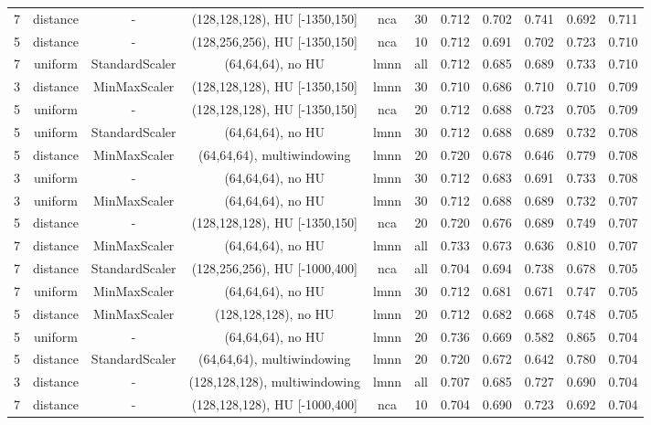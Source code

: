 \begin{sidewaystable}[!htbp]
{\begin{tabular}{ccccccccccc}
7 & distance & - & (128,128,128), HU [-1350,150] & nca & 30 & 0.712 & 0.702 & 0.741 & 0.692 & 0.711 \\
5 & distance & - & (128,256,256), HU [-1350,150] & nca & 10 & 0.712 & 0.691 & 0.702 & 0.723 & 0.710 \\
7 & uniform & StandardScaler & (64,64,64), no HU & lmnn & all & 0.712 & 0.685 & 0.689 & 0.733 & 0.710 \\
3 & distance & MinMaxScaler & (128,128,128), HU [-1350,150] & lmnn & 30 & 0.710 & 0.686 & 0.710 & 0.710 & 0.709 \\
5 & uniform & - & (128,128,128), HU [-1350,150] & nca & 20 & 0.712 & 0.688 & 0.723 & 0.705 & 0.709 \\
5 & uniform & StandardScaler & (64,64,64), no HU & lmnn & 30 & 0.712 & 0.688 & 0.689 & 0.732 & 0.708 \\
5 & distance & MinMaxScaler & (64,64,64), multiwindowing & lmnn & 20 & 0.720 & 0.678 & 0.646 & 0.779 & 0.708 \\
3 & uniform & - & (64,64,64), no HU & lmnn & 30 & 0.712 & 0.683 & 0.691 & 0.733 & 0.708 \\
3 & uniform & MinMaxScaler & (64,64,64), no HU & lmnn & 30 & 0.712 & 0.688 & 0.689 & 0.732 & 0.707 \\
5 & distance & - & (128,128,128), HU [-1350,150] & nca & 20 & 0.720 & 0.676 & 0.689 & 0.749 & 0.707 \\
7 & distance & MinMaxScaler & (64,64,64), no HU & lmnn & all & 0.733 & 0.673 & 0.636 & 0.810 & 0.707 \\
7 & distance & StandardScaler & (128,256,256), HU [-1000,400] & nca & all & 0.704 & 0.694 & 0.738 & 0.678 & 0.705 \\
7 & uniform & MinMaxScaler & (64,64,64), no HU & lmnn & 30 & 0.712 & 0.681 & 0.671 & 0.747 & 0.705 \\
5 & distance & MinMaxScaler & (128,128,128), no HU & lmnn & 20 & 0.712 & 0.682 & 0.668 & 0.748 & 0.705 \\
5 & uniform & - & (64,64,64), no HU & lmnn & 20 & 0.736 & 0.669 & 0.582 & 0.865 & 0.704 \\
5 & distance & StandardScaler & (64,64,64), multiwindowing & lmnn & 20 & 0.720 & 0.672 & 0.642 & 0.780 & 0.704 \\
3 & distance & - & (128,128,128), multiwindowing & lmnn & all & 0.707 & 0.685 & 0.727 & 0.690 & 0.704 \\
7 & distance & - & (128,128,128), HU [-1000,400] & nca & 10 & 0.704 & 0.690 & 0.723 & 0.692 & 0.704 \\

\end{tabular}}
\end{sidewaystable}
